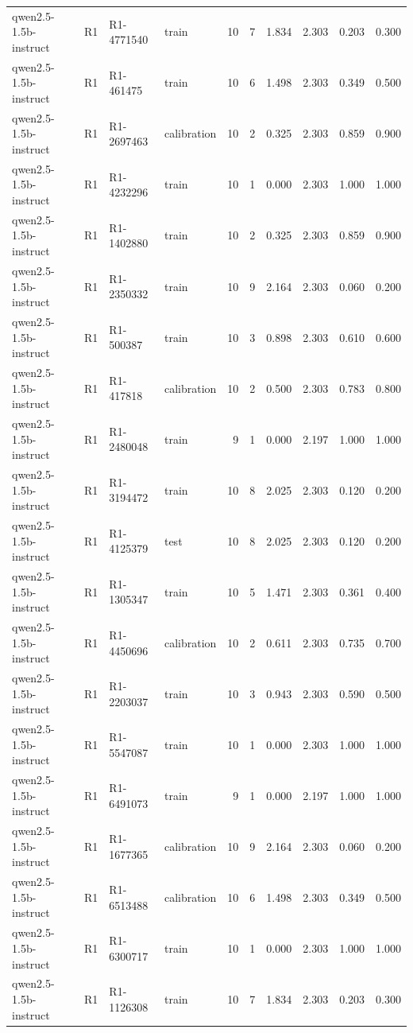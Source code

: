 \begin{table}
\begin{tabular}{llllrrrrrr}
qwen2.5-1.5b-instruct & R1 & R1-4771540 & train & 10 & 7 & 1.834 & 2.303 & 0.203 & 0.300 \\
qwen2.5-1.5b-instruct & R1 & R1-461475 & train & 10 & 6 & 1.498 & 2.303 & 0.349 & 0.500 \\
qwen2.5-1.5b-instruct & R1 & R1-2697463 & calibration & 10 & 2 & 0.325 & 2.303 & 0.859 & 0.900 \\
qwen2.5-1.5b-instruct & R1 & R1-4232296 & train & 10 & 1 & 0.000 & 2.303 & 1.000 & 1.000 \\
qwen2.5-1.5b-instruct & R1 & R1-1402880 & train & 10 & 2 & 0.325 & 2.303 & 0.859 & 0.900 \\
qwen2.5-1.5b-instruct & R1 & R1-2350332 & train & 10 & 9 & 2.164 & 2.303 & 0.060 & 0.200 \\
qwen2.5-1.5b-instruct & R1 & R1-500387 & train & 10 & 3 & 0.898 & 2.303 & 0.610 & 0.600 \\
qwen2.5-1.5b-instruct & R1 & R1-417818 & calibration & 10 & 2 & 0.500 & 2.303 & 0.783 & 0.800 \\
qwen2.5-1.5b-instruct & R1 & R1-2480048 & train & 9 & 1 & 0.000 & 2.197 & 1.000 & 1.000 \\
qwen2.5-1.5b-instruct & R1 & R1-3194472 & train & 10 & 8 & 2.025 & 2.303 & 0.120 & 0.200 \\
qwen2.5-1.5b-instruct & R1 & R1-4125379 & test & 10 & 8 & 2.025 & 2.303 & 0.120 & 0.200 \\
qwen2.5-1.5b-instruct & R1 & R1-1305347 & train & 10 & 5 & 1.471 & 2.303 & 0.361 & 0.400 \\
qwen2.5-1.5b-instruct & R1 & R1-4450696 & calibration & 10 & 2 & 0.611 & 2.303 & 0.735 & 0.700 \\
qwen2.5-1.5b-instruct & R1 & R1-2203037 & train & 10 & 3 & 0.943 & 2.303 & 0.590 & 0.500 \\
qwen2.5-1.5b-instruct & R1 & R1-5547087 & train & 10 & 1 & 0.000 & 2.303 & 1.000 & 1.000 \\
qwen2.5-1.5b-instruct & R1 & R1-6491073 & train & 9 & 1 & 0.000 & 2.197 & 1.000 & 1.000 \\
qwen2.5-1.5b-instruct & R1 & R1-1677365 & calibration & 10 & 9 & 2.164 & 2.303 & 0.060 & 0.200 \\
qwen2.5-1.5b-instruct & R1 & R1-6513488 & calibration & 10 & 6 & 1.498 & 2.303 & 0.349 & 0.500 \\
qwen2.5-1.5b-instruct & R1 & R1-6300717 & train & 10 & 1 & 0.000 & 2.303 & 1.000 & 1.000 \\
qwen2.5-1.5b-instruct & R1 & R1-1126308 & train & 10 & 7 & 1.834 & 2.303 & 0.203 & 0.300 \\

\end{tabular}
\end{table}
